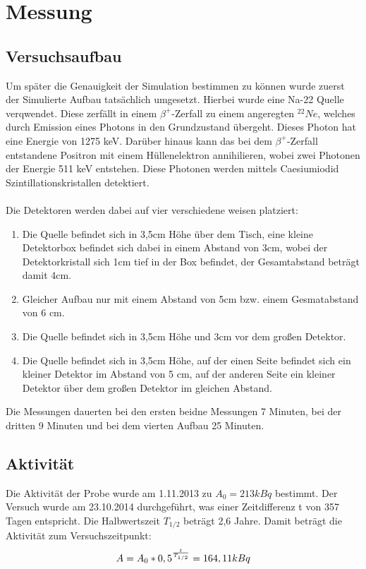 \documentclass[a4paper,14pt,twoside]{article}
\begin{document}
\section{Messung}
\subsection{Versuchsaufbau}
Um später die Genauigkeit der Simulation bestimmen zu können wurde zuerst der Simulierte Aufbau tatsächlich umgesetzt. Hierbei wurde eine Na-22 Quelle verqwendet. Diese zerfällt in einem $\beta^+$-Zerfall zu einem angeregten $^{22}Ne$, welches durch Emission eines Photons in den Grundzustand übergeht. Dieses Photon hat eine Energie von 1275 keV. Darüber hinaus kann das bei dem $\beta^+$-Zerfall entstandene Positron mit einem Hüllenelektron annihilieren, wobei zwei Photonen der Energie 511 keV entstehen.
Diese Photonen werden mittels Caesiumiodid Szintillationskristallen detektiert. \\\\Die Detektoren werden dabei auf vier verschiedene weisen platziert:
\begin{enumerate}
\item Die Quelle befindet sich in 3,5cm Höhe über dem Tisch, eine kleine Detektorbox befindet sich dabei in einem Abstand von 3cm, wobei der Detektorkristall sich 1cm tief in der Box befindet, der Gesamtabstand beträgt damit 4cm.
\item Gleicher Aufbau nur mit einem Abstand von 5cm bzw. einem Gesmatabstand von 6 cm.
\item Die Quelle befindet sich in 3,5cm Höhe und 3cm vor dem großen Detektor.
\item Die Quelle befindet sich in 3,5cm Höhe, auf der einen Seite befindet sich ein kleiner Detektor im Abstand von 5 cm, auf der anderen Seite ein kleiner Detektor über dem großen Detektor im gleichen Abstand.
\end{enumerate}
Die Messungen dauerten bei den ersten beidne Messungen 7 Minuten, bei der dritten 9 Minuten und bei dem vierten Aufbau 25 Minuten.


\subsection{Aktivität}
Die Aktivität der Probe wurde am 1.11.2013 zu $A_0=213 kBq$ bestimmt. Der Versuch wurde am 23.10.2014 durchgeführt, was einer Zeitdifferenz t von 357 Tagen entspricht. Die Halbwertszeit $T_{1/2}$ beträgt 2,6 Jahre. Damit beträgt die Aktivität zum Versuchszeitpunkt:
\begin{equation}
A=A_0*0,5^{t\over T_{1/2}}=164,11 kBq
\end{equation}
\end{document}
